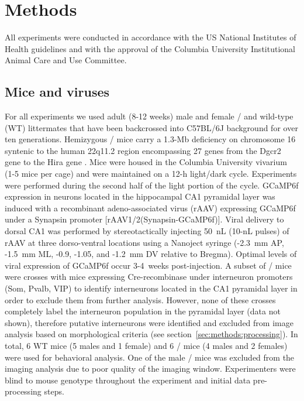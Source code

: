 \section{Methods}

All experiments were conducted in accordance with the US National Institutes of Health guidelines and with the approval of the Columbia University Institutional Animal Care and Use Committee.

\subsection{Mice and viruses}
\label{sec:methods:mice}

For all experiments we used adult (8-12 weeks) male and female \df/ and wild-type (WT) littermates that have been backcrossed into C57BL/6J background for over ten generations. Hemizygous \df/ mice carry a 1.3-Mb deficiency on chromosome 16 syntenic to the human 22q11.2 region encompassing 27 genes from the Dgcr2 gene to the Hira gene \citep{Mukai2008, Stark2008}. Mice were housed in the Columbia University vivarium (1-5 mice per cage) and were maintained on a 12-h light/dark cycle. Experiments were performed during the second half of the light portion of the cycle.  GCaMP6f expression in neurons located in the hippocampal CA1 pyramidal layer was induced with a recombinant adeno-associated virus (rAAV) expressing GCaMP6f under a Synapsin promoter [rAAV1/2(Synapsin-GCaMP6f)]. Viral delivery to dorsal CA1 was performed by stereotactically injecting 50~nL (10-nL pulses) of rAAV at three dorso-ventral locations using a Nanoject syringe (-2.3~mm AP, -1.5~mm ML, -0.9, -1.05, and -1.2~mm DV relative to Bregma). Optimal levels of viral expression of GCaMP6f occur 3-4~weeks post-injection. A subset of \df/ mice were crosses with mice expressing Cre-recombinase under interneuron promoters (Som, Pvalb, VIP) \citep{Lovett-Barron2014} to identify interneurons located in the CA1 pyramidal layer in order to exclude them from further analysis. However, none of these crosses completely label the interneuron population in the pyramidal layer (data not shown), therefore putative interneurons were identified and excluded from image analysis based on morphological criteria (see section~\ref{sec:methods:processing}). In total, 6 WT mice (5 males and 1 female) and 6 \df/ mice (4 males and 2 females) were used for behavioral analysis. One of the male \df/ mice was excluded from the imaging analysis due to poor quality of the imaging window. Experimenters were blind to mouse genotype throughout the experiment and initial data pre-processing steps.

